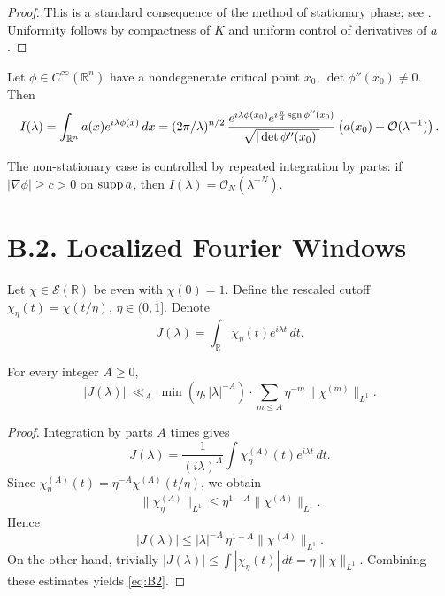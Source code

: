 \begin{proof}
This is a standard consequence of the method of stationary phase; see
\cite[Thm.~7.7.5]{HormanderI}. Uniformity follows by compactness of $K$ and uniform control of derivatives of $a$.
\end{proof}

\begin{corollary}\label{cor:B1-multi}
Let $\phi\in C^\infty(\mathbb{R}^n)$ have a nondegenerate critical point $x_0$, $\det \phi''(x_0)\neq 0$. Then
\begin{equation}\label{eq:B1-multi}
I(\lambda)=\int_{\mathbb{R}^n} a(x)e^{i\lambda\phi(x)}\,dx
= (2\pi/\lambda)^{n/2}\,
\frac{e^{i\lambda\phi(x_0)}e^{i\frac{\pi}{4}\operatorname{sgn}\phi''(x_0)}}{\sqrt{|\det \phi''(x_0)|}}
\left(a(x_0)+\mathcal{O}(\lambda^{-1})\right).
\end{equation}
\end{corollary}

\begin{remark}
The non-stationary case is controlled by repeated integration by parts:
if $|\nabla\phi|\ge c>0$ on $\operatorname{supp} a$, then $I(\lambda)=\mathcal{O}_N(\lambda^{-N})$.
\end{remark}

\section{B.2. Localized Fourier Windows}\label{sec:B2}

Let $\chi\in\mathcal{S}(\mathbb{R})$ be even with $\chi(0)=1$.
Define the rescaled cutoff $\chi_\eta(t)=\chi(t/\eta)$, $\eta\in(0,1]$.
Denote
\[
J(\lambda)=\int_{\mathbb{R}}\chi_\eta(t)e^{i\lambda t}\,dt.
\]

\begin{lemma}\label{lem:B2}
For every integer $A\ge 0$,
\begin{equation}\label{eq:B2}
|J(\lambda)|\ \ll_A\ \min(\eta,|\lambda|^{-A}) \cdot
\sum_{m\le A}\eta^{-m}\|\chi^{(m)}\|_{L^1}.
\end{equation}
\end{lemma}

\begin{proof}
Integration by parts $A$ times gives
\[
J(\lambda)=\frac{1}{(i\lambda)^A}\int \chi_\eta^{(A)}(t)e^{i\lambda t}\,dt.
\]
Since $\chi_\eta^{(A)}(t)=\eta^{-A}\chi^{(A)}(t/\eta)$, we obtain
\[
\|\chi_\eta^{(A)}\|_{L^1}\le \eta^{1-A}\|\chi^{(A)}\|_{L^1}.
\]
Hence
\[
|J(\lambda)|\le |\lambda|^{-A}\,\eta^{1-A}\|\chi^{(A)}\|_{L^1}.
\]
On the other hand, trivially $|J(\lambda)|\le \int |\chi_\eta(t)|\,dt=\eta\|\chi\|_{L^1}$.
Combining these estimates yields \eqref{eq:B2}.
\end{proof}

